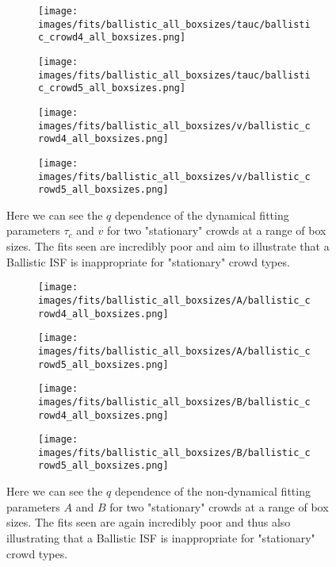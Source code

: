 \documentclass[10pt]{article}
\begin{document}
\begin{figure}[H]
\begin{subfigure}[t]{.5\textwidth}
  \centering
 \texttt{[image: images/fits/ballistic\_all\_boxsizes/tauc/ballistic\_crowd4\_all\_boxsizes.png]}
  \caption{}
\end{subfigure}%
\hfill
\begin{subfigure}[t]{.5\textwidth}
  \centering
  \texttt{[image: images/fits/ballistic\_all\_boxsizes/tauc/ballistic\_crowd5\_all\_boxsizes.png]}
  \caption{}
\end{subfigure}
\label{fig:crowd_ballistic_fits_tauc_all_boxsizes}
\par\bigskip
\begin{subfigure}[t]{.5\textwidth}
  \centering
 \texttt{[image: images/fits/ballistic\_all\_boxsizes/v/ballistic\_crowd4\_all\_boxsizes.png]}
  \caption{}
\end{subfigure}%
\hfill
\begin{subfigure}[t]{.5\textwidth}
  \centering
  \texttt{[image: images/fits/ballistic\_all\_boxsizes/v/ballistic\_crowd5\_all\_boxsizes.png]}
  \caption{}
\end{subfigure}
\caption{Here we can see the $q$ dependence of the dynamical fitting parameters $\tau_c$ and $v$ for two "stationary" crowds at a range of box sizes. The fits seen are incredibly poor and aim to illustrate that a Ballistic ISF is inappropriate for "stationary" crowd types.}
\label{fig:crowd_ballistic_fits_v_all_boxsizes}
\end{figure}

\begin{figure}[H]
\begin{subfigure}[t]{.5\textwidth}
  \centering
 \texttt{[image: images/fits/ballistic\_all\_boxsizes/A/ballistic\_crowd4\_all\_boxsizes.png]}
  \caption{}
\end{subfigure}%
\hfill
\begin{subfigure}[t]{.5\textwidth}
  \centering
  \texttt{[image: images/fits/ballistic\_all\_boxsizes/A/ballistic\_crowd5\_all\_boxsizes.png]}
  \caption{}
\end{subfigure}
\label{fig:crowd_ballistic_fits_A_all_boxsizes}
\par\bigskip
\begin{subfigure}[t]{.5\textwidth}
  \centering
 \texttt{[image: images/fits/ballistic\_all\_boxsizes/B/ballistic\_crowd4\_all\_boxsizes.png]}
  \caption{}
\end{subfigure}%
\hfill
\begin{subfigure}[t]{.5\textwidth}
  \centering
  \texttt{[image: images/fits/ballistic\_all\_boxsizes/B/ballistic\_crowd5\_all\_boxsizes.png]}
  \caption{}
\end{subfigure}
\caption{Here we can see the $q$ dependence of the non-dynamical fitting parameters $A$ and $B$ for two "stationary" crowds at a range of box sizes. The fits seen are again incredibly poor and thus also illustrating that a Ballistic ISF is inappropriate for "stationary" crowd types.}
\label{fig:crowd_ballistic_fits_tauc_B_boxsizes}
\end{figure}
\end{document}
